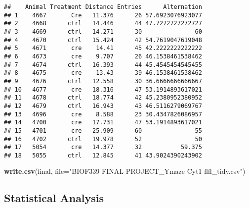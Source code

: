 \documentclass[]{article}
\newenvironment{Shaded}{\begin{snugshade}}{\end{snugshade}}
\newcommand{\DataTypeTok}[1]{\textcolor[rgb]{0.13,0.29,0.53}{#1}}
\newcommand{\KeywordTok}[1]{\textcolor[rgb]{0.13,0.29,0.53}{\textbf{#1}}}
\newcommand{\NormalTok}[1]{#1}
\newcommand{\OperatorTok}[1]{\textcolor[rgb]{0.81,0.36,0.00}{\textbf{#1}}}
\newcommand{\StringTok}[1]{\textcolor[rgb]{0.31,0.60,0.02}{#1}}
\begin{document}
\begin{verbatim}
##    Animal Treatment Distance Entries      Alternation
## 1    4667       Cre   11.376      26 57.6923076923077
## 2    4668      ctrl   14.446      44 47.7272727272727
## 3    4669      ctrl   14.271      30               60
## 4    4670      ctrl   15.424      42 54.7619047619048
## 5    4671       cre    14.41      45 42.2222222222222
## 6    4673       cre    9.707      26 46.1538461538462
## 7    4674      ctrl   16.393      44 45.4545454545455
## 8    4675       cre    13.43      39 46.1538461538462
## 9    4676      ctrl   12.558      30 36.6666666666667
## 10   4677       cre   18.316      47 53.1914893617021
## 11   4678      ctrl   18.774      42 45.2380952380952
## 12   4679      ctrl   16.943      43 46.5116279069767
## 13   4696       cre    8.588      23 30.4347826086957
## 14   4700       cre   17.731      47 53.1914893617021
## 15   4701       cre   25.909      60               55
## 16   4702      ctrl   19.978      52               50
## 17   5054       cre   14.377      32           59.375
## 18   5055      ctrl   12.845      41 43.9024390243902
\end{verbatim}

\begin{Shaded}
\begin{Highlighting}[]
\KeywordTok{write.csv}\NormalTok{(final, }\DataTypeTok{file=}\StringTok{"BIOF339 FINAL PROJECT_Ymaze Cyt1 flfl_tidy.csv"}\NormalTok{)}
\end{Highlighting}
\end{Shaded}

\hypertarget{statistical-analysis}{%
\subsection{Statistical Analysis}\label{statistical-analysis}}

\begin{Shaded}
\end{Shaded}
\end{document}

